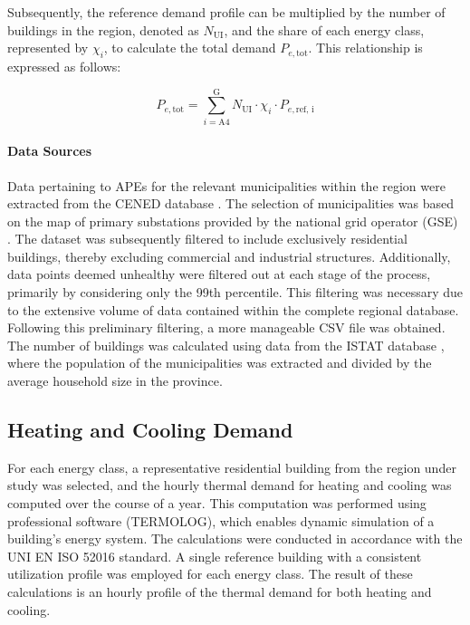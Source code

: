 Subsequently, the reference demand profile can be multiplied by the number of buildings in the region, denoted as $N_{\text{UI}}$, and the share of each energy class, represented by $\chi_i$, to calculate the total demand $P_{e,\text{tot}}$. This relationship is expressed as follows:

\begin{equation}
    P_{e, \text{tot}} = 
    \sum_{i=\text{A4}}^{\text{G}} 
    N_{\text{UI}} 
    \cdot 
    \chi_{i}
    \cdot
    P_{e, \text{ref, i}} 
\end{equation}



\paragraph{Data Sources}
Data pertaining to APEs for the relevant municipalities within the region were extracted from the CENED database \cite{cened2025}. The selection of municipalities was based on the map of primary substations provided by the national grid operator (GSE) \cite{gse_cabine_primarie}. The dataset was subsequently filtered to include exclusively residential buildings, thereby excluding commercial and industrial structures. Additionally, data points deemed unhealthy were filtered out at each stage of the process, primarily by considering only the 99th percentile. This filtering was necessary due to the extensive volume of data contained within the complete regional database. Following this preliminary filtering, a more manageable CSV file was obtained. The number of buildings was calculated using data from the ISTAT database \cite{istat2023}, where the population of the municipalities was extracted and divided by the average household size in the province.

\subsection{Heating and Cooling Demand}
For each energy class, a representative residential building from the region under study was selected, and the hourly thermal demand for heating and cooling was computed over the course of a year. This computation was performed using professional software (TERMOLOG), which enables dynamic simulation of a building's energy system. The calculations were conducted in accordance with the UNI EN ISO 52016 standard. A single reference building with a consistent utilization profile was employed for each energy class. The result of these calculations is an hourly profile of the thermal demand for both heating and cooling.

